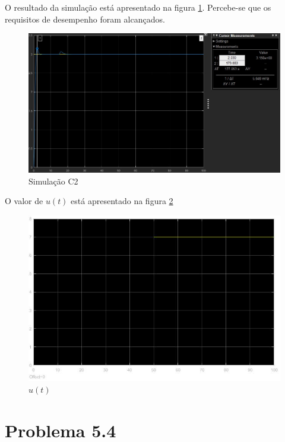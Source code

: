 \documentclass[
]{book}
\theoremstyle{definition}
\theoremstyle{definition}
\theoremstyle{definition}
\theoremstyle{remark}
\begin{document}
O resultado da simulação está apresentado na figura \ref{fig:prob3C1}. Percebe-se que os requisitos de desempenho foram alcançados.

\begin{figure}

{\centering \includegraphics[width=0.8\linewidth]{Imagens/Lab5/Resolução/prob3C1} 

}

\caption{Simulação C2}\label{fig:prob3C1}
\end{figure}

O valor de \(u(t)\) está apresentado na figura \ref{fig:prob3C2}

\begin{figure}

{\centering \includegraphics[width=0.8\linewidth]{Imagens/Lab5/Resolução/prob3C2} 

}

\caption{$u(t)$}\label{fig:prob3C2}
\end{figure}

\hypertarget{problema-5.4}{%
\section*{Problema 5.4}\label{problema-5.4}}
\end{document}

